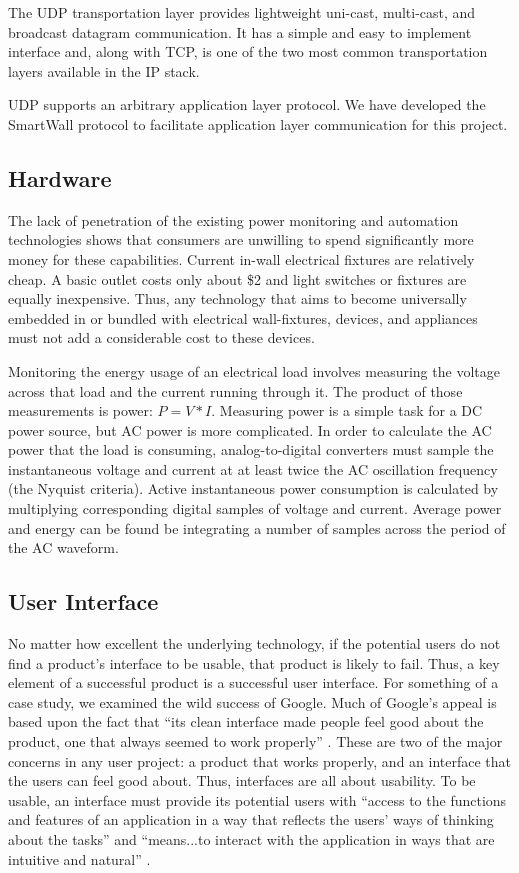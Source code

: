 \documentclass[12pt]{article}
\begin{document}
The UDP transportation layer provides lightweight uni-cast, multi-cast, and
broadcast datagram communication. It has a simple and easy to
implement interface and, along with TCP, is one of the two most common
transportation layers available in the IP stack.

UDP supports an arbitrary application layer protocol. We have
developed the SmartWall protocol to facilitate application layer
communication for this project.

\subsection{Hardware}
The lack of penetration of the existing power monitoring
and automation technologies shows that consumers are unwilling to
spend significantly more money for these capabilities.
Current in-wall electrical fixtures are relatively cheap. A basic outlet
costs only about \$2 and light switches or fixtures are equally
inexpensive. Thus, any technology that aims to become universally
embedded in or bundled with electrical wall-fixtures, devices, and
appliances must not add a considerable cost to these devices.

Monitoring the energy usage of an electrical load involves measuring
the voltage across that load and the current running through it. The
product of those measurements is power: $P = V*I$.  Measuring power is a
simple task for a DC power source, but AC power is more
complicated. In order to calculate the AC power that the load is
consuming, analog-to-digital converters must sample the instantaneous
voltage and current at at least twice the AC oscillation frequency
(the Nyquist criteria). Active instantaneous power consumption is
calculated by multiplying corresponding digital samples of voltage and
current. Average power and energy can be found be integrating a number of
samples across the period of the AC waveform.

\subsection{User Interface}
No matter how excellent the underlying technology, if the potential
users do not find a product’s interface to be usable, that product is
likely to fail. Thus, a key element of a successful product is a
successful user interface. For something of a case study, we examined the
wild success of Google. Much of Google's appeal is based upon the fact
that “its clean interface made people feel good about the product,
one that always seemed to work properly” \cite{googleStory}. These are
two of the major concerns in any user project: a product that works
properly, and an
interface that the users can feel good about. Thus, interfaces are
all about usability. To be usable, an interface must provide its
potential users with “access to the functions and features of an
application in a way that reflects the users’ ways of thinking about
the tasks” and “means...to interact with the application in ways that
are intuitive and natural” \cite{UIDesign}.
\end{document}
